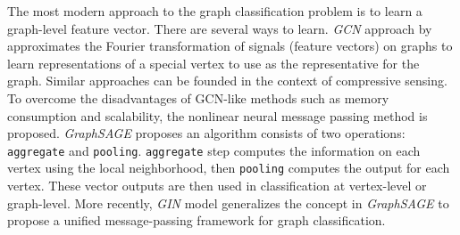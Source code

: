 \documentclass[portrait,final,archD,fontscale=0.477]{baposter}
\begin{document}
\begin{poster}
{The most modern approach to the graph classification problem is to learn 
a graph-level feature vector. There are several ways to 
learn. \emph{GCN} approach 
by approximates the Fourier transformation of 
signals (feature vectors) on graphs to 
learn representations of a special vertex to use as the representative 
for the graph. Similar approaches 
can be founded in the context of compressive sensing. 
To overcome the disadvantages of GCN-like methods 
such as memory consumption and scalability, the nonlinear neural message
passing method is proposed. 
\emph{GraphSAGE} proposes an algorithm 
consists of 
two operations: \texttt{aggregate} and \texttt{pooling}. 
\texttt{aggregate} step computes the information 
on each vertex using the local neighborhood, then \texttt{pooling} 
computes the output for each vertex.
These vector outputs are then used in classification at 
vertex-level or graph-level. More recently, 
\emph{GIN} model generalizes the concept in \emph{GraphSAGE} to 
propose a unified
message-passing framework for graph classification.

}

\end{poster}
\end{document}
